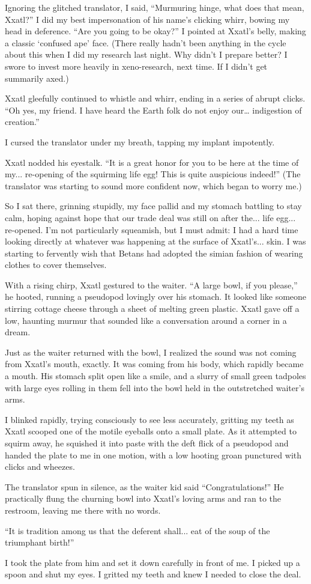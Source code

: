 Ignoring the glitched translator, I said, ``Murmuring hinge, what does
that mean, Xxatl?'' I did my best impersonation of his name's clicking
whirr, bowing my head in deference. ``Are you going to be okay?'' I
pointed at Xxatl's belly, making a classic `confused ape' face. (There
really hadn't been anything in the cycle about this when I did my
research last night. Why didn't I prepare better? I swore to invest more
heavily in xeno-research, next time. If I didn't get summarily axed.)

Xxatl gleefully continued to whistle and whirr, ending in a series of
abrupt clicks. ``Oh yes, my friend. I have heard the Earth folk do not
enjoy our\ldots{} indigestion of creation.''

I cursed the translator under my breath, tapping my implant impotently.

Xxatl nodded his eyestalk. ``It is a great honor for you to be here at
the time of my... re-opening of the squirming life egg! This is quite
auspicious indeed!'' (The translator was starting to sound more
confident now, which began to worry me.)

So I sat there, grinning stupidly, my face pallid and my stomach
battling to stay calm, hoping against hope that our trade deal was still
on after the... life egg... re-opened. I'm not particularly squeamish,
but I must admit: I had a hard time looking directly at whatever was
happening at the surface of Xxatl's... skin. I was starting to fervently
wish that Betans had adopted the simian fashion of wearing clothes to
cover themselves.

With a rising chirp, Xxatl gestured to the waiter. ``A large bowl, if
you please,'' he hooted, running a pseudopod lovingly over his stomach.
It looked like someone stirring cottage cheese through a sheet of
melting green plastic. Xxatl gave off a low, haunting murmur that
sounded like a conversation around a corner in a dream.

Just as the waiter returned with the bowl, I realized the sound was not
coming from Xxatl's mouth, exactly. It was coming from his body, which
rapidly became a mouth. His stomach split open like a smile, and a
slurry of small green tadpoles with large eyes rolling in them fell into
the bowl held in the outstretched waiter's arms.

I blinked rapidly, trying consciously to see less accurately, gritting
my teeth as Xxatl scooped one of the motile eyeballs onto a small plate.
As it attempted to squirm away, he squished it into paste with the deft
flick of a pseudopod and handed the plate to me in one motion, with a
low hooting groan punctured with clicks and wheezes.

The translator spun in silence, as the waiter kid said
``Congratulations!'' He practically flung the churning bowl into Xxatl's
loving arms and ran to the restroom, leaving me there with no words.

``It is tradition among us that the deferent shall... eat of the soup of
the triumphant birth!''

I took the plate from him and set it down carefully in front of me. I
picked up a spoon and shut my eyes. I gritted my teeth and knew I needed
to close the deal.
